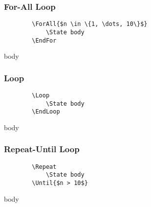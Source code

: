 \documentclass[11pt,a4paper,USenglish]{article}
\begin{document}
\subsubsection{For-All Loop}
\begin{minipage}[t]{0.45\textwidth}
	\begin{verbatim}
		\ForAll{$n \in \{1, \dots, 10\}$}
		    \State body
		\EndFor
	\end{verbatim}
\end{minipage}
\hfill
\begin{minipage}[t]{0.45\textwidth}
	\begin{algorithmic}
		    \State body
		\EndFor
	\end{algorithmic}
\end{minipage}

\subsubsection{Loop}
\begin{minipage}[t]{0.45\textwidth}
	\begin{verbatim}
		\Loop
		    \State body
		\EndLoop
	\end{verbatim}
\end{minipage}
\hfill
\begin{minipage}[t]{0.45\textwidth}
	\begin{algorithmic}
		\Loop
		    \State body
		\EndLoop
	\end{algorithmic}
\end{minipage}

\subsubsection{Repeat-Until Loop}
\begin{minipage}[t]{0.45\textwidth}
	\begin{verbatim}
		\Repeat
		    \State body
		\Until{$n > 10$}
	\end{verbatim}
\end{minipage}
\hfill
\begin{minipage}[t]{0.45\textwidth}
	\begin{algorithmic}
		\Repeat
		    \State body
		\Until{$n > 10$}
	\end{algorithmic}
\end{minipage}
\end{document}
